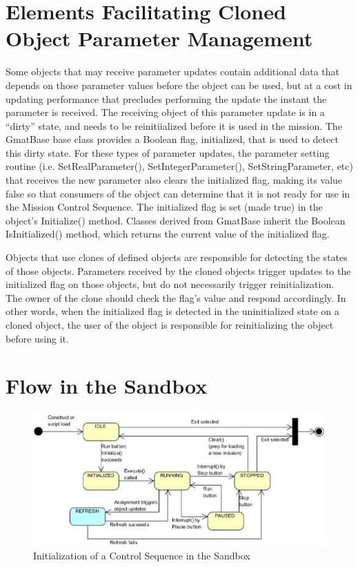 \documentclass[10pt,letterpaper]{article}
\begin{document}
\section{Elements Facilitating Cloned Object Parameter Management}



Some objects that may receive parameter updates contain additional data that depends on those parameter values before the object can be used, but at a cost in updating performance that precludes performing the update the instant the parameter is received.  The receiving object of this parameter update is in a ``dirty'' state, and needs to be reinitiialized before it is used in the mission.  The GmatBase base class provides a Boolean flag, initialized, that is used to detect this dirty state.  For these types of parameter updates, the parameter setting routine (i.e. SetRealParameter(), SetIntegerParameter(), SetStringParameter, etc) that receives the new parameter also clears the initialized flag, making its value false so that consumers of the object can determine that it is not ready for use in the Mission Control Sequence.  The initialized flag is set (made true) in the object's Initialize() method.  Classes derived from GmatBase inherit the Boolean IsInitialized() method, which returns the current value of the initialized flag. 

Objects that use clones of defined objects are responsible for detecting the states of those objects.  Parameters received by the cloned objects trigger updates to the initialized flag on those objects, but do not necessarily trigger reinitialization.  The owner of the clone should check the flag's value and respond accordingly.  In other words, when the initialized flag is detected in the uninitialized state on a cloned object, the user of the object is responsible for reinitializing the object before using it.

\section{Flow in the Sandbox}

\begin{figure}[htb]
\begin{center}
\includegraphics[scale=0.6]{Images/SandboxStateTransitions-updated.eps}
\caption{\label{figure:SandboxStates}Initialization of a Control Sequence in the Sandbox}
\end{center}
\end{figure}
\end{document}
